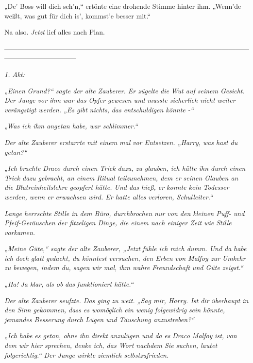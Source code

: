{„De' Boss will dich seh'n,“ ertönte eine drohende Stimme hinter ihm. „Wenn'de weißt, was gut für dich is', kommst'e besser mit.“

Na also. \emph{Jetzt} lief alles nach Plan.

--------------------------------------------------------------------------------------------------------------------------------------------

\emph{1. Akt:}

\emph{„Einen} \emph{\emph{Grund?}“ sagte der alte Zauberer. Er zügelte die} \emph{Wut auf seinem Gesicht. Der Junge vor ihm war das Opfer gewesen und musste sicherlich nicht weiter verängstigt werden. „Es gibt} \emph{\emph{nichts,}} \emph{das entschuldigen könnte -“}

\emph{„Was ich ihm angetan habe, war schlimmer.“}

\emph{Der alte Zauberer erstarrte} \emph{mit einem mal} \emph{vor Entsetzen. „Harry,} \emph{\emph{was hast du getan?}“}

\emph{„Ich brachte Draco durch einen Trick dazu, zu glauben, ich hätte ihn durch einen Trick dazu gebracht, an einem Ritual teilzunehmen, dem er seinen Glauben an die Blutreinheitslehre geopfert hätte. Und das hieß, er konnte kein Todesser werden, wenn er erwachsen wird. Er hatte alles verloren, Schulleiter.“}

\emph{Lange herrschte Stille in dem Büro, durchbrochen nur von den kleinen Puff- und Pfeif-Geräuschen der fitzeligen Dinge, die einem nach einiger Zeit wie Stille vorkamen.}

\emph{„Meine Güte,“ sagte der alte Zauberer, „\emph{Jetzt}} \emph{fühle ich mich dumm. Und da} \emph{\emph{habe}} \emph{ich doch} \emph{glatt} \emph{gedacht, du könntest versuchen, den Erben von Malfoy zur Umkehr zu bewegen, indem du, sagen wir mal,} \emph{\emph{ihm wahre Freundschaft und Güte zeigst.}“}

\emph{„\emph{Ha!}} \emph{Ja klar, als ob} \emph{\emph{das}} \emph{funktioniert hätte.“}

\emph{Der alte Zauberer seufzte. Das ging zu weit. „Sag mir, Harry. Ist dir} \emph{überhaupt} \emph{\emph{in den Sinn gekommen,}} \emph{dass es womöglich ein wenig} \emph{\emph{folgewidrig}} \emph{sein könnte, jemandes Besserung durch Lügen und} \emph{Täuschung anzustreben?“}

\emph{„Ich habe es getan, ohne} \emph{ihn} \emph{direkt} \emph{anzulügen und da} \emph{es} \emph{Draco Malfoy} \emph{ist, von dem wir hier} \emph{sprechen, denke ich, das Wort nachdem Sie suchen, lautet} \emph{\emph{folgerichtig.}“ Der Junge wirkte ziemlich selbstzufrieden.}

}
